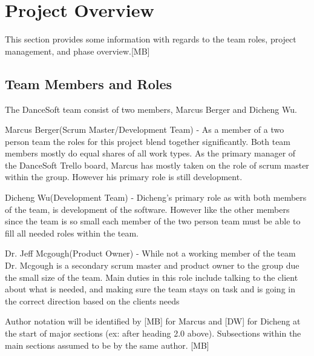 

\chapter{Project Overview}
This section provides some information with regards to the 
team roles, project management, and phase overview.[MB]

\section{Team Members and Roles}
The DanceSoft team consist of two members, Marcus Berger and Dicheng Wu.

Marcus Berger(Scrum Master/Development Team) -  As a member of a two person team the roles for this project blend together significantly. Both team members mostly do equal shares of all work types. As the primary manager of the DanceSoft Trello board, Marcus has mostly taken on the role of scrum master within the group. However his primary role is still development.

Dicheng Wu(Development Team) - Dicheng's primary role as with both members of the team, is development of the software. However like the other members since the team is so small each member of the two person team must be able to fill all needed roles within the team.

Dr. Jeff Mcgough(Product Owner) - While not a working member of the team Dr. Mcgough is a secondary scrum master and product owner to the group due the small size of the team. Main duties in this role include talking to the client about what is needed, and making sure the team stays on task and is going in the correct direction based on the clients needs 

Author notation will be identified by [MB] for Marcus and [DW] for Dicheng at the start of
major sections (ex: after heading 2.0 above). Subsections within the main sections assumed to be by the
same author. [MB]



